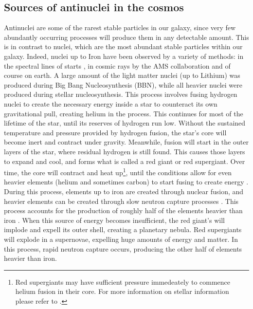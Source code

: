 \subsection{Sources of antinuclei in the cosmos}
Antinuclei are some of the rarest stable particles in our galaxy, since very few abundantly occurring processes will produce them in any detectable amount\cite{}. This is in contrast to nuclei, which are the most abundant stable particles within our galaxy. Indeed, nuclei up to Iron have been observed by a variety of methods: in the spectral lines of starts \cite{}, in cosmic rays by the AMS collaboration \cite{} and of course on earth. A large amount of the light matter nuclei (up to Lithium) was produced during Big Bang Nucleosynthesis (BBN)\cite{}, while all heavier nuclei were produced during stellar nucleosynthesis\cite{}. This process involves fusing hydrogen nuclei to create the necessary energy inside a star to counteract its own gravitational pull, creating helium in the process. This continues for most of the lifetime of the star, until its reserves of hydrogen run low. Without the sustained temperature and pressure provided by hydrogen fusion, the star's core will become inert and contract under gravity. Meanwhile, fusion will start in the outer layers of the star, where residual hydrogen is still found. This causes those layers to expand and cool, and forms what is called a red giant\cite{} or red supergiant\cite{}. Over time, the core will contract and heat up\footnote{Red supergiants may have sufficient pressure immedeately to commence helium fusion in their core. For more information on stellar information please refer to \cite{}.}, until the conditions allow for even heavier elements (helium and sometimes carbon) to start fusing to create energy \cite{}. During this process, elements up to iron are created through nuclear fusion, and heavier elements can be created through slow neutron capture processes \cite{}. This process accounts for the production of roughly half of the elements heavier than iron \cite{}. When this source of energy becomes insufficient, the red giant's will implode and expell its outer shell, creating a planetary nebula. Red supergiants will explode in a supernovae\cite{}, expelling huge amounts of energy and matter. In this process, rapid neutron capture occurs, producing the other half of elements heavier than iron\cite{}. \\
